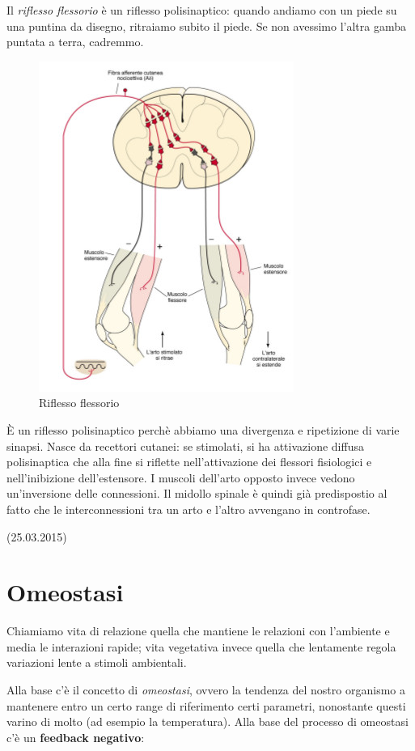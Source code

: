 \documentclass[a4paper,12pt]{article}
\begin{document}
Il \emph{riflesso flessorio} è un riflesso polisinaptico: quando andiamo con un piede su una puntina da disegno, ritraiamo subito il piede. Se non avessimo l'altra gamba puntata a terra, cadremmo. 
\begin{figure}[H]
\centering
\includegraphics[scale=0.4]{immagine/flessorio.jpg}
\caption{Riflesso flessorio}
\end{figure}

È un riflesso polisinaptico perchè abbiamo una divergenza e ripetizione di varie sinapsi. Nasce da recettori cutanei: se stimolati, si ha attivazione diffusa polisinaptica che alla fine si riflette nell'attivazione dei flessori fisiologici e nell'inibizione dell'estensore. I muscoli dell'arto opposto invece vedono un'inversione delle connessioni. Il midollo spinale è quindi già predispostio al fatto che le interconnessioni tra un arto e l'altro avvengano in controfase.

(25.03.2015)

\section{Omeostasi}
Chiamiamo vita di relazione quella che mantiene le relazioni con l'ambiente e media le interazioni rapide; vita vegetativa invece quella che lentamente regola variazioni lente a stimoli ambientali. 
 
Alla base c'è il concetto di \emph{omeostasi}, ovvero la tendenza del nostro organismo a mantenere entro un certo range di riferimento certi parametri, nonostante questi varino di molto (ad esempio la temperatura). Alla base del processo di omeostasi c'è un \textbf{feedback negativo}:
 
\end{document}
